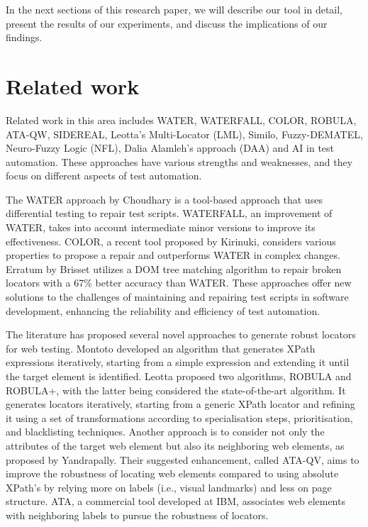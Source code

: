 \documentclass{article}
\begin{document}
In the next sections of this research paper, we will describe our tool in detail, present the results of our experiments, and discuss the implications of our findings.

\maketitle

\section{Related work}

Related work in this area includes WATER\cite{water}, WATERFALL\cite{waterfall}, COLOR\cite{color}, ROBULA\cite{robula}, ATA-QW\cite{ata}, SIDEREAL\cite{sidereal}, Leotta's Multi-Locator (LML)\cite{lml}, Similo\cite{similo}, Fuzzy-DEMATEL, Neuro-Fuzzy Logic (NFL), Dalia Alamleh's approach (DAA)\cite{fuzzy_ai_in_web_testing} and AI in test automation\cite{ai_in_test_auto}. These approaches have various strengths and weaknesses, and they focus on different aspects of test automation.

The WATER approach by Choudhary\cite{water} is a tool-based approach that uses differential testing to repair test scripts. WATERFALL\cite{waterfall}, an improvement of WATER\cite{water}, takes into account intermediate minor versions to improve its effectiveness. COLOR, a recent tool proposed by Kirinuki\cite{color}, considers various properties to propose a repair and outperforms WATER\cite{water} in complex changes. Erratum by Brisset\cite{erratum} utilizes a DOM tree matching algorithm to repair broken locators with a 67\% better accuracy than WATER\cite{water}. These approaches offer new solutions to the challenges of maintaining and repairing test scripts in software development, enhancing the reliability and efficiency of test automation.

The literature has proposed several novel approaches to generate robust locators for web testing\cite{robust_locators, robula+}. Montoto\cite{montoto} developed an algorithm that generates XPath expressions iteratively, starting from a simple expression and extending it until the target element is identified. Leotta proposed two algorithms, ROBULA\cite{robula} and ROBULA+\cite{robula+}, with the latter being considered the state-of-the-art algorithm. It generates locators iteratively, starting from a generic XPath locator and refining it using a set of transformations according to specialisation steps, prioritisation, and blacklisting techniques. Another approach is to consider not only the attributes of the target web element but also its neighboring web elements, as proposed by Yandrapally\cite{yandrapally}. Their suggested enhancement, called ATA-QV\cite{ata}, aims to improve the robustness of locating web elements compared to using absolute XPath's by relying more on labels (i.e., visual landmarks) and less on page structure. ATA\cite{ata}, a commercial tool developed at IBM, associates web elements with neighboring labels to pursue the robustness of locators.
\end{document}
